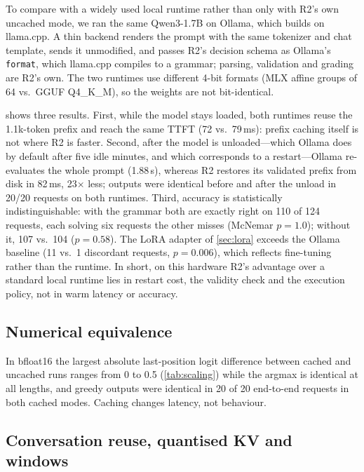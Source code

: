 \documentclass[10pt,twocolumn,letterpaper]{article}
\theoremstyle{definition}
\begin{document}
To compare with a widely used local runtime rather than only with R2's own uncached mode, we ran
the same Qwen3-1.7B on Ollama, which builds on llama.cpp. A thin backend renders the prompt with the
same tokenizer and chat template, sends it unmodified, and passes R2's decision schema as Ollama's
\texttt{format}, which llama.cpp compiles to a grammar; parsing, validation and grading are R2's
own. The two runtimes use different 4-bit formats (MLX affine groups of 64 vs.\ GGUF Q4\_K\_M), so the
weights are not bit-identical.

 shows three results. First, while the model stays loaded, both runtimes reuse
the 1.1k-token prefix and reach the same TTFT (72 vs.\ 79\,ms): prefix caching itself is not where
R2 is faster. Second, after the model is unloaded---which Ollama does by default after five idle
minutes, and which corresponds to a restart---Ollama re-evaluates the whole prompt (1.88\,s), whereas
R2 restores its validated prefix from disk in 82\,ms, 23$\times$ less; outputs were identical before
and after the unload in 20/20 requests on both runtimes. Third, accuracy is statistically
indistinguishable: with the grammar both are exactly right on 110 of 124 requests, each solving six
requests the other misses (McNemar $p=1.0$); without it, 107 vs.\ 104 ($p=0.58$). The LoRA adapter
of \cref{sec:lora} exceeds the Ollama baseline (11 vs.\ 1 discordant requests, $p=0.006$), which
reflects fine-tuning rather than the runtime. In short, on this hardware R2's advantage over a
standard local runtime lies in restart cost, the validity check and the execution policy, not in
warm latency or accuracy.

\subsection{Numerical equivalence}\label{sec:equiv}

In bfloat16 the largest absolute last-position logit difference between cached and uncached runs
ranges from 0 to 0.5 (\cref{tab:scaling}) while the argmax is identical at all lengths, and greedy
outputs were identical in 20 of 20 end-to-end requests in both cached modes. Caching changes
latency, not behaviour.

\subsection{Conversation reuse, quantised KV and windows}\label{sec:convreuse}\label{sec:kvvariants}
\end{document}
